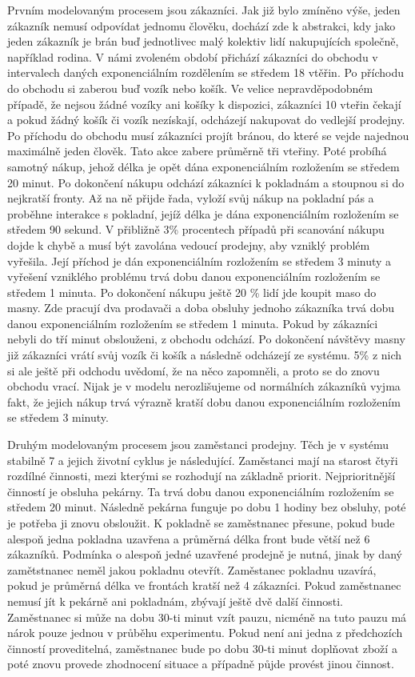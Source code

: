 \documentclass[12pt,a4paper,titlepage]{article}
\begin{document}
Prvním modelovaným procesem jsou zákazníci. Jak již bylo zmíněno výše, jeden zákazník nemusí odpovídat jednomu člověku, dochází zde k abstrakci, kdy jako jeden zákazník je brán buď jednotlivec malý kolektiv lidí nakupujících společně, například rodina. V námi zvoleném období přichází zákazníci do obchodu v intervalech daných exponenciálním rozdělením se středem 18 vtěřin. Po příchodu do obchodu si zaberou buď vozík nebo košík. Ve velice nepravděpodobném případě, že nejsou žádné vozíky ani košíky k dispozici, zákazníci 10 vteřin čekají a pokud žádný košík či vozík nezískají, odcházejí nakupovat do vedlejší prodejny. Po příchodu do obchodu musí zákazníci projít bránou, do které se vejde najednou maximálně jeden člověk. Tato akce zabere průměrně tři vteřiny. Poté probíhá samotný nákup, jehož délka je opět dána exponenciálním rozložením se středem 20 minut. Po dokončení nákupu odchází zákazníci k pokladnám a stoupnou si do nejkratší fronty. Až na ně přijde řada, vyloží svůj nákup na pokladní pás a proběhne interakce s pokladní, jejíž délka je dána exponenciálním rozložením se středem 90 sekund. V přibližně 3\% procentech případů při scanování nákupu dojde k chybě a musí být zavolána vedoucí prodejny, aby vzniklý problém vyřešila. Její příchod je dán exponenciálním rozložením se středem 3 minuty a vyřešení vzniklého problému trvá dobu danou exponenciálním rozložením se středem 1 minuta. Po dokončení nákupu ještě 20 \% lidí jde koupit maso do masny. Zde pracují dva prodavači a doba obsluhy jednoho zákazníka trvá dobu danou exponenciálním rozložením se středem 1 minuta. Pokud by zákazníci nebyli do tří minut obslouženi, z obchodu odchází. Po dokončení návštěvy masny již zákazníci vrátí svůj vozík či košík a následně odcházejí ze systému. 5\% z nich si ale ještě při odchodu uvědomí, že na něco zapomněli, a proto se do znovu obchodu vrací. Nijak je v modelu nerozlišujeme od normálních zákazníků vyjma fakt, že jejich nákup trvá výrazně kratší dobu danou exponenciálním rozložením se středem 3 minuty.

Druhým modelovaným procesem jsou zaměstanci prodejny. Těch je v systému stabilně 7 a jejich životní cyklus je následující. Zaměstanci mají na starost čtyři rozdílné činnosti, mezi kterými se rozhodují na základně priorit. Nejprioritnější činností je obsluha pekárny. Ta trvá dobu danou exponenciálním rozložením se středem 20 minut. Následně pekárna funguje po dobu 1 hodiny bez obsluhy, poté je potřeba ji znovu obsloužit. K pokladně se zaměstnanec přesune, pokud bude alespoň jedna pokladna uzavřena a průměrná délka front bude větší než 6 zákazníků. Podmínka o alespoň jedné uzavřené prodejně je nutná, jinak by daný zamětstnanec neměl jakou pokladnu otevřít. Zaměstanec pokladnu uzavírá, pokud je průměrná délka ve frontách kratší než 4 zákazníci. Pokud zaměstnanec nemusí jít k pekárně ani pokladnám, zbývají ještě dvě další činnosti. Zaměstnanec si může na dobu 30-ti minut vzít pauzu, nicméně na tuto pauzu má nárok pouze jednou v průběhu experimentu. Pokud není ani jedna z předchozích činností proveditelná, zaměstnanec bude po dobu 30-ti minut doplňovat zboží a poté znovu provede zhodnocení situace a případně půjde provést jinou činnost.
\end{document}
